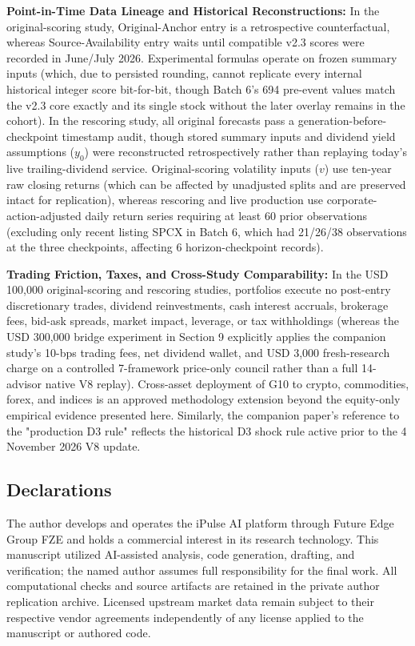 \documentclass[11pt,a4paper]{article}
\numberwithin{table}{section}
\begin{document}
\textbf{Point-in-Time Data Lineage and Historical Reconstructions:}  In the original-scoring study, Original-Anchor entry is a retrospective counterfactual, whereas Source-Availability entry waits until compatible v2.3 scores were recorded in June/July 2026. Experimental formulas operate on frozen summary inputs (which, due to persisted rounding, cannot replicate every internal historical integer score bit-for-bit, though Batch 6's 694 pre-event values match the v2.3 core exactly and its single stock without the later overlay remains in the cohort). In the rescoring study, all original forecasts pass a generation-before-checkpoint timestamp audit, though stored summary inputs and dividend yield assumptions ($y_0$) were reconstructed retrospectively rather than replaying today's live trailing-dividend service. Original-scoring volatility inputs ($v$) use ten-year raw closing returns (which can be affected by unadjusted splits and are preserved intact for replication), whereas rescoring and live production use corporate-action-adjusted daily return series requiring at least 60 prior observations (excluding only recent listing SPCX in Batch 6, which had 21/26/38 observations at the three checkpoints, affecting 6 horizon-checkpoint records).

\textbf{Trading Friction, Taxes, and Cross-Study Comparability:}  In the USD 100,000 original-scoring and rescoring studies, portfolios execute no post-entry discretionary trades, dividend reinvestments, cash interest accruals, brokerage fees, bid-ask spreads, market impact, leverage, or tax withholdings (whereas the USD 300,000 bridge experiment in Section 9 explicitly applies the companion study's 10-bps trading fees, net dividend wallet, and USD 3,000 fresh-research charge on a controlled 7-framework price-only council rather than a full 14-advisor native V8 replay). Cross-asset deployment of G10 to crypto, commodities, forex, and indices is an approved methodology extension beyond the equity-only empirical evidence presented here. Similarly, the companion paper's reference to the "production D3 rule" reflects the historical D3 shock rule active prior to the 4 November 2026 V8 update.

\subsection{Declarations}

The author develops and operates the iPulse AI platform through Future Edge Group FZE and holds a commercial interest in its research technology. This manuscript utilized AI-assisted analysis, code generation, drafting, and verification; the named author assumes full responsibility for the final work. All computational checks and source artifacts are retained in the private author replication archive. Licensed upstream market data remain subject to their respective vendor agreements independently of any license applied to the manuscript or authored code.
\end{document}
